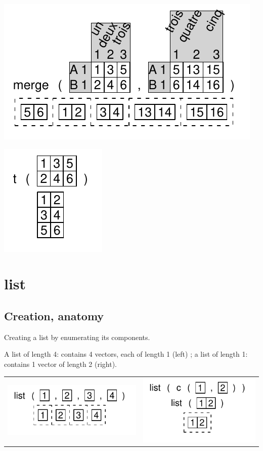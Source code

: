 \documentclass[pdflatex]{article}
\begin{document}
\includegraphics{merge.pdf} 

\includegraphics{t.pdf} 

\section{list}

\subsection{Creation, anatomy}

Creating a list by enumerating its components.

A list of length 4: contains 4 vectors, each of length 1 (left) ;
a list of length 1: contains 1 vector of length 2 (right).

\begin{tabular}{cc}
\includegraphics{list_enumerate.pdf} & \includegraphics{list_onetype.pdf}
\end{tabular}
\end{document}
